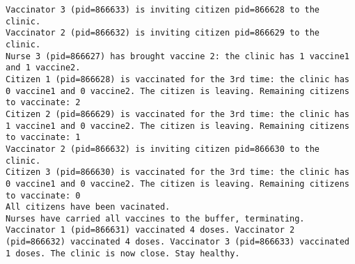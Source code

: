 \documentclass[a4paper]{article}
\begin{document}
\begin{verbatim}
Vaccinator 3 (pid=866633) is inviting citizen pid=866628 to the clinic.
Vaccinator 2 (pid=866632) is inviting citizen pid=866629 to the clinic.
Nurse 3 (pid=866627) has brought vaccine 2: the clinic has 1 vaccine1 and 1 vaccine2.
Citizen 1 (pid=866628) is vaccinated for the 3rd time: the clinic has 0 vaccine1 and 0 vaccine2. The citizen is leaving. Remaining citizens to vaccinate: 2
Citizen 2 (pid=866629) is vaccinated for the 3rd time: the clinic has 1 vaccine1 and 0 vaccine2. The citizen is leaving. Remaining citizens to vaccinate: 1
Vaccinator 2 (pid=866632) is inviting citizen pid=866630 to the clinic.
Citizen 3 (pid=866630) is vaccinated for the 3rd time: the clinic has 0 vaccine1 and 0 vaccine2. The citizen is leaving. Remaining citizens to vaccinate: 0
All citizens have been vacinated.
Nurses have carried all vaccines to the buffer, terminating.
Vaccinator 1 (pid=866631) vaccinated 4 doses. Vaccinator 2 (pid=866632) vaccinated 4 doses. Vaccinator 3 (pid=866633) vaccinated 1 doses. The clinic is now close. Stay healthy.
\end{verbatim}
\end{document}
